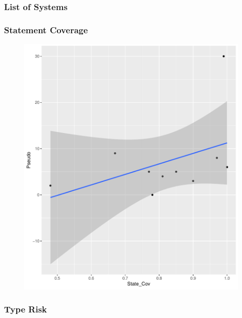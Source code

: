 \begin{frame}
  \frametitle{List of Systems}
  
\end{frame}

\begin{frame}
  \frametitle{Statement Coverage}
  \begin{figure}
  \includegraphics[scale = .35]{images/stateCovPlot}
  \end{figure}
\end{frame}

\begin{frame}
  \frametitle{Type Risk}
  
\end{frame}
